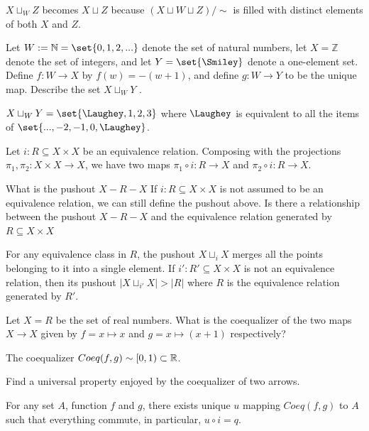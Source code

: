 \documentclass{article}
\begin{document}
\ans

$X \sqcup_W Z$ becomes $X \sqcup Z$ because $(X \sqcup W \sqcup Z)/\sim$ is
filled with distinct elements of both $X$ and $Z$.


Let $W := \N = \set{0,1,2,... }$ denote the set of natural numbers, let $X =
\mathbb{Z}$ denote the set of integers, and let $Y = \set{\Smiley}$ denote a
one-element set. Define $f : W \to X$ by $f(w) = -(w+1)$, and define $g: W \to Y$ to be
the unique map. Describe the set $X \sqcup_W Y$ .

\ans

$X \sqcup_W Y = \set{\Laughey, 1, 2, 3}$ where $\Laughey$ is equivalent to all
the items of $\set{..., -2, -1, 0, \Laughey}$.


Let $i: R \subseteq X \times X$ be an equivalence relation. Composing with the
projections $\pi_1, \pi_2 : X \times X \to X$, we have two maps $\pi_1 \circ i :
R \to X$ and $\pi_2 \circ i: R \to X$.

\es What is the pushout $X - R - X$
\ei If $i: R \subseteq X \times X$ is not assumed to be an equivalence relation,
    we can still define the pushout above. Is there a relationship between the
    pushout $X - R - X$ and the equivalence relation generated by $R \subseteq X
    \times X$
\ee

\ans

\es For any equivalence class in $R$, the pushout $X \sqcup_{i} X$ merges all
    the points belonging to it into a single element.
\ei If $i' : R' \subseteq X \times X$ is not an equivalence relation, then its
    pushout $|X \sqcup_{i'} X| > |R|$ where $R$ is the equivalence relation
    generated by $R'$.
\ee


Let $X = R$ be the set of real numbers. What is the coequalizer of the two maps
$X \to X$ given by $f = x \mapsto x$ and $g = x \mapsto (x + 1)$ respectively?

\ans

The coequalizer $Coeq(f,g) \sim [0,1) \subset \mathbb{R}$.


Find a universal property enjoyed by the coequalizer of two arrows.

\ans

For any set $A$, function $f$ and $g$, there exists unique $u$ mapping
$Coeq(f,g)$ to $A$ such that everything commute, in particular, $u \circ i = q$.
\end{document}
